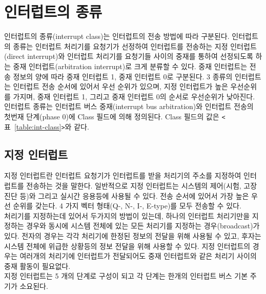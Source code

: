 \section{인터럽트의 종류}
인터럽트의 종류(interrupt class)는 인터럽트의 전송 방법에 따라 구분된다.
인터럽트의 종류는
인터럽트 처리기를 요청기가 선정하여 인터럽트를 전송하는 지정 인터럽트(direct interrupt)와
인터럽트 처리기를 요청기들 사이의 중재를 통하여 선정되도록 하는 
중재 인터럽트(arbitration interrupt)로 크게 분류할 수 있다.
중재 인터럽트는 전송 정보의 양에 따라 중재 인터럽트 1, 중재 인터럽트 0로 구분된다.
3 종류의 인터럽트는 인터럽트 전송 순서에 있어서 우선 순위가 있으며,
지정 인터럽트가 높은 우선순위를 가지며, 중재 인터럽트 1, 그리고 중재 인터럽트 0의 순서로 우선순위가 낮아진다.
인터럽트 종류는 인터럽트 버스 중재(interrupt bus arbitration)와
인터럽트 전송의 첫번재 단계(phase 0)에 Class 필드에 의해 정의된다.
Class 필드의 값은 {\tt <}표~\ref{table:int-class}{\tt >}와 같다.

%
\subsection{지정 인터럽트}
지정 인터럽트란 인터럽트 요청기가 인터럽트를 받을 처리기의 주소를 지정하여 
인터럽트를 전송하는 것을 말한다.
일반적으로 지정 인터럽트는 시스템의 제어(시험, 고장 진단 등)와 
그리고 실시간 응용등에 사용될 수 있다.
전송 순서에 있어서 가장 높은 우선 순위를 갖는다. 
4 가지 벡터 형태(Q-, N-, I-, E-type)를 모두 전송할 수 있다. \\
처리기를 지정하는데 있어서 두가지의 방법이 있는데, 하나의 인터럽트 처리기만을
지정하는 경우와 동시에 시스템 전체에 있는 모든 처리기를 지정하는 경우(broadcast)가 있다.
전자의 경우는 각각 처리기에 한정된 정보의 전달을 위해 사용될 수 있고,
후자는 시스템 전체에 위급한 상황등의 정보 전달을 위해 사용할 수 있다.
지정 인터럽트의 경우는 여러개의 처리기에 인터럽트가 전달되어도 
중재 인터럽트와 같은 처리기 사이의 중재 활동이 필요없다. \\
지정 인터럽트는 5 개의 단계로 구성이 되고 각 단계는 한개의 인터럽트 버스 기본 주기가 소요된다.
%
